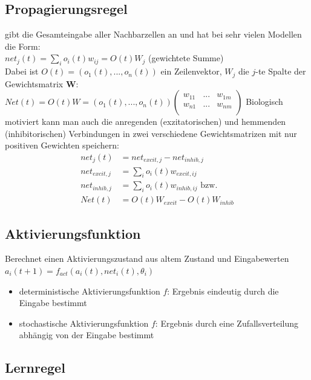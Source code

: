 \subsection{Propagierungsregel}
gibt die Gesamteingabe aller Nachbarzellen an und hat bei sehr vielen Modellen die Form:\\
$net_j(t) = \sum_i o_i(t)w_{ij} = O(t)W_j$ (gewichtete Summe)\\
Dabei ist $O(t) = (o_1(t),...,o_n(t))$ ein Zeilenvektor, $W_j$ die $j$-te Spalte der Gewichtsmatrix $\textbf{W}$:\\
$Net(t) = O(t)W =  (o_1(t),...,o_n(t))\begin{pmatrix}
w_{11} & ... & w_{1m}\\
w_{n1} & ... & w_{nm}\\
\end{pmatrix}$ \newline
Biologisch motiviert kann man auch die anregenden (exzitatorischen) und hemmenden (inhibitorischen) Verbindungen in zwei verschiedene Gewichtsmatrizen mit nur positiven Gewichten speichern: \\
\begin{align*}
net_j(t) &= net_{excit,j} - net_{inhib,j}\\
net_{excit,j} &= \sum_i o_i(t)w_{excit,ij}\\
net_{inhib,j} &= \sum_i o_i(t)w_{inhib,ij} \text{ bzw. }\\
Net(t) &= O(t)W_{excit} - O(t)W_{inhib}
\end{align*}

\subsection{Aktivierungsfunktion}
Berechnet einen Aktivierungszustand aus altem Zustand und Eingabewerten\\
$a_i(t+1) = f_{act}(a_i(t), net_i(t), \theta_i)$
\begin{itemize}
\item deterministische Aktivierungsfunktion $f$: Ergebnis eindeutig durch die Eingabe bestimmt
\item stochastische Aktivierungsfunktion $f$: Ergebnis durch eine Zufallsverteilung abhängig von der Eingabe bestimmt
\end{itemize}

\subsection{Lernregel}

